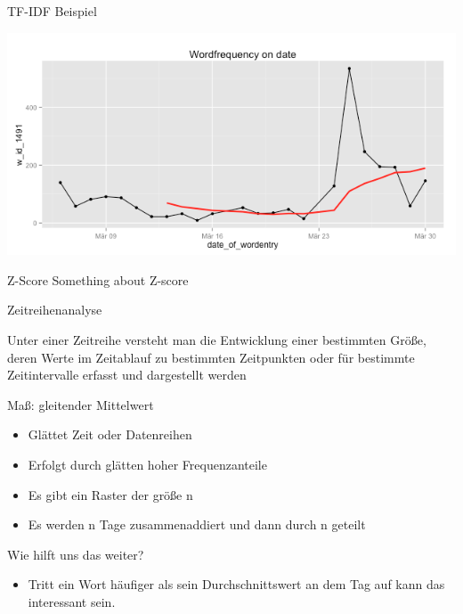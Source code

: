 \documentclass{beamer}
\begin{document}
\begin{frame}{TF-IDF Beispiel}
	\hspace{1cm}
	  \begin{centering}
	  \includegraphics[width=1\textwidth]{pictures/freqratioFlugzeug.png}
	\end{centering}
\end{frame}



\begin{frame}{Z-Score}
	Something about Z-score
\end{frame}

\begin{frame}{Zeitreihenanalyse}
 \begin{definition}[Zeitreihenanalyse]
 	Unter einer Zeitreihe
	versteht man die Entwicklung einer bestimmten Größe, deren Werte im Zeitablauf zu bestimmten Zeitpunkten oder für bestimmte Zeitintervalle erfasst und dargestellt
	werden
 \end{definition}
	
\end{frame}

\begin{frame}{Maß: gleitender Mittelwert}
	\begin{itemize}
		\item Glättet Zeit oder Datenreihen
		\item Erfolgt durch glätten hoher Frequenzanteile
		\item Es gibt ein Raster der größe n		
		\item Es werden n Tage zusammenaddiert und dann durch n geteilt
	\end{itemize}
	
	Wie hilft uns das weiter?
	
	\begin{itemize}
		\item Tritt ein Wort häufiger als sein Durchschnittswert an dem Tag auf kann das interessant sein.
	\end{itemize}		
	
\end{frame}
\end{document}

